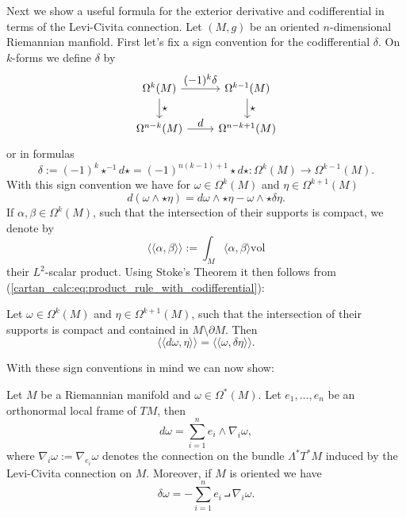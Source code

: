 Next we show a useful formula for the exterior derivative and codifferential in terms of the Levi-Civita connection. Let $(M,g)$ be an oriented $n$-dimensional Riemannian manfiold. First let's fix a sign convention for the codifferential $\delta$. On $k$-forms we define $\delta$ by 
\[
\begin{tikzcd}
	{\Omega^k(M)} & {\Omega^{k-1}(M)} \\
	{\Omega^{n-k}(M)} & {\Omega^{n-k+1}(M)}
	\arrow["{\textstyle (-1)^k\delta}", from=1-1, to=1-2]
	\arrow["{\textstyle \star}", from=1-1, to=2-1]
	\arrow["{\textstyle \star}", from=1-2, to=2-2]
	\arrow["{\textstyle d}", from=2-1, to=2-2]
\end{tikzcd}
\]
or in formulas 
\[
\delta := (-1)^k\star^{-1} d \star = (-1)^{n(k-1)+1} \star d \star \colon \Omega^k(M) \to \Omega^{k-1}(M).
\]
With this sign convention we have for $\omega \in \Omega^k(M)$ and $\eta \in \Omega^{k+1}(M)$
\begin{equation}
    d(\omega \wedge \star \eta) = d\omega \wedge \star\eta - \omega \wedge \star \delta \eta. \label{cartan_calc:eq:product_rule_with_codifferential}
\end{equation}
If $\alpha,\beta \in \Omega^k(M)$, such that the intersection of their supports is compact, we denote by 
\[
\langle\langle \alpha,\beta \rangle\rangle := \int_M \langle \alpha,\beta \rangle \mathrm{vol}
\]
their $L^2$-scalar product. Using Stoke's Theorem it then follows from (\ref{cartan_calc:eq:product_rule_with_codifferential}):

\begin{lemma}
    Let $\omega \in \Omega^k(M)$ and $\eta \in \Omega^{k+1}(M)$, such that the intersection of their supports is compact and contained in $M \setminus \partial M$. Then 
    \[
    \langle\langle d\omega,\eta \rangle\rangle = \langle\langle \omega,\delta\eta \rangle\rangle.
    \]
\end{lemma}

With these sign conventions in mind we can now show:

\begin{lemma}
    \label{cartan_calc:lem:formula_for_d_and_codifferential}
    Let $M$ be a Riemannian manifold and $\omega \in \Omega^\ast(M)$. Let $e_1,\ldots,e_n$ be an orthonormal local frame of $TM$, then 
    \[
    d\omega = \sum_{i=1}^n e_i \wedge \nabla_i\omega,
    \]
    where $\nabla_i \omega := \nabla_{e_i}\omega$ denotes the connection on the bundle $\Lambda^\ast T^\ast M$ induced by the Levi-Civita connection on $M$. Moreover, if $M$ is oriented we have 
    \[
    \delta\omega =  - \sum_{i=1}^n e_i \intprod \nabla_i\omega.
    \]
\end{lemma}

